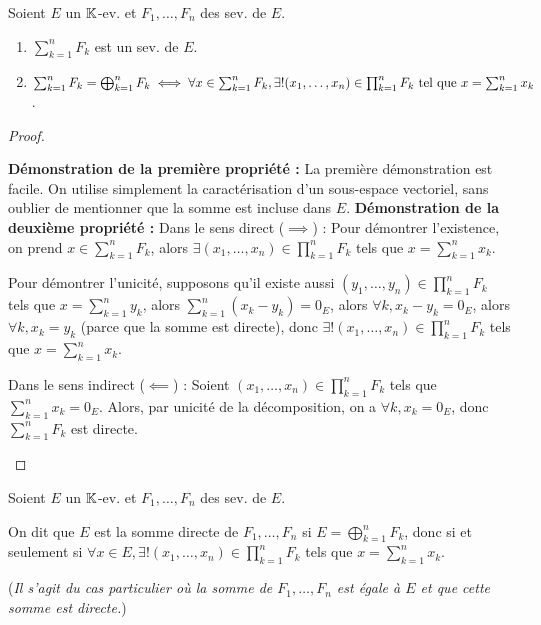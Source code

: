 \documentclass[12pt, a4paper]{report}
\begin{document}
\begin{property}
    Soient $E$ un $\mathbb{K}$-ev. et $F_1,\dots,F_n$ des sev. de $E$.
    \begin{enumerate}
        \item $\sum_{k=1}^{n}F_k$ est un sev. de $E$.
        \item $\sum_{k=1}^n F_k = \bigoplus_{k=1}^n F_k \iff \forall x \in \sum_{k=1}^n F_k, \exists ! (x_1,\dots,x_n) \in \prod_{k=1}^n F_k \text{ tel que } x = \sum_{k=1}^n x_k$.
    \end{enumerate}
\end{property}

\begin{proof}
    \begin{outline}[enumerate]
        \1 \textbf{Démonstration de la première propriété :} La première démonstration est facile. On utilise simplement la caractérisation d'un sous-espace vectoriel, sans oublier de mentionner que la somme est incluse dans $E$.
        \1 \textbf{Démonstration de la deuxième propriété :}
            \2 Dans le sens direct ($\implies$) :
                \3 Pour démontrer l'existence, on prend $x \in \sum_{k=1}^n F_k$, alors $\exists (x_1,\dots,x_n) \in \prod_{k=1}^n F_k$ tels que $x = \sum_{k=1}^n x_k$.
                
                \3 Pour démontrer l'unicité, supposons qu'il existe aussi $(y_1,\dots,y_n) \in \prod_{k=1}^n F_k$ tels que $x = \sum_{k=1}^n y_k$, alors $\sum_{k=1}^n (x_k - y_k) = 0_E$, alors $\forall k, x_k - y_k = 0_E$, alors $\forall k, x_k = y_k$ (parce que la somme est directe), donc $\exists ! (x_1,\dots,x_n) \in \prod_{k=1}^n F_k$ tels que $x = \sum_{k=1}^n x_k$.

            \2 Dans le sens indirect ($\impliedby$) :
                \3 Soient $(x_1,\dots,x_n) \in \prod_{k=1}^n F_k$ tels que $\sum_{k=1}^n x_k = 0_E$.
                \3 Alors, par unicité de la décomposition, on a $\forall k, x_k = 0_E$, donc $\sum_{k=1}^n F_k$ est directe.
    \end{outline}
\end{proof}

\begin{definition}
    Soient $E$ un $\mathbb{K}$-ev. et $F_1,\dots,F_n$ des sev. de $E$.

    On dit que $E$ est la somme directe de $F_1,\dots,F_n$ si $E = \bigoplus_{k=1}^n F_k$, donc si et seulement si $\forall x \in E, \exists ! (x_1,\dots,x_n) \in \prod_{k=1}^n F_k$ tels que $x = \sum_{k=1}^n x_k$.

    (\textit{Il s'agit du cas particulier où la somme de $F_1,\dots,F_n$ est égale à $E$ et que cette somme est directe.})
\end{definition}
\end{document}
